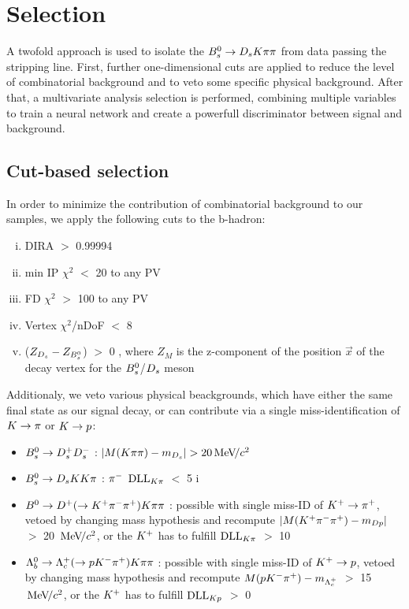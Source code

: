 \section{Selection}

A twofold approach is used to isolate the ${{B}^0_{s}}\rightarrow{\ensuremath{{D}_{s}}}{\ensuremath{K}}{\ensuremath{\pi}}{\ensuremath{\pi}}$ from data passing the stripping line. 
First, further one-dimensional cuts are applied to reduce the level of combinatorial background and to veto some specific physical background. 
After that, a multivariate analysis selection is performed, combining multiple variables to train a neural network and create a powerfull discriminator between signal and background. 

\subsection{Cut-based selection}

In order to minimize the contribution of combinatorial background to our samples, we apply the following cuts to the b-hadron:

\begin{enumerate}[(i)]

\item DIRA $>$ 0.99994

\item min IP $\chi^{2}$ $<$ 20 to any PV

\item FD $\chi^{2}$ $>$ 100 to any PV

\item Vertex $\chi^{2}$/nDoF $<$ 8 

\item ($Z_{{{D}_{s}}}-Z_{{{B}^0_{s}}}$) $>$ 0 , where $Z_{M}$ is the z-component of the position $\vec{x}$ of the decay vertex for the ${{B}^0_{s}}$/${{D}_{s}}$ meson

\end{enumerate}    


Additionaly, we veto various physical beackgrounds, which have either the same final state as our signal decay, or can contribute via a single miss-identification of ${K}\rightarrow{\ensuremath{\pi}}$ or ${K}\rightarrow{\ensuremath{p}}$:

\begin{itemize}

\item ${{B}^0_{s}}\rightarrow{\ensuremath{{D}^+_{s}}}{\ensuremath{{D}^-_{s}}}$ : $|M({K}{\pi}{\pi}) - m_{{{D}_{s}}}| > 20 {\mathrm{\,Me\kern -0.1em V\!/}c^2}$ 

\item ${{B}^0_{s}}\rightarrow{\ensuremath{{D}_{s}}}{\ensuremath{K}}{\ensuremath{K}}{\ensuremath{\pi}}$ : ${{\pi}^-}$ $\mathrm{DLL}_{{K}{\pi}}$ $<$ 5 
i
\item ${{B}^0}\rightarrow{\ensuremath{{D}^+}}(\rightarrow{\ensuremath{{K}^+}}{\ensuremath{{\pi}^-}}{\ensuremath{{\pi}^+}}){K}{\pi}{\pi}$ : possible with single miss-ID of ${{K}^+}\rightarrow{\ensuremath{{\pi}^+}}$, vetoed by changing mass hypothesis and recompute $|M({{K}^+}{{\pi}^-}{{\pi}^+}) - m_{Dp}|$ $>$ 20 ${\mathrm{\,Me\kern -0.1em V\!/}c^2}$, 
or the ${{K}^+}$ has to fulfill $\mathrm{DLL}_{{K}{\pi}}$ $>$ 10

\item ${{\Lambda}^0_{b}}\rightarrow{\ensuremath{{\Lambda}^+_{c}}}(\rightarrow{\ensuremath{p}}{\ensuremath{{K}^-}}{\ensuremath{{\pi}^+}}){K}{\pi}{\pi}$ : possible with single miss-ID of ${{K}^+}\rightarrow{\ensuremath{p}}$, vetoed by changing mass hypothesis and recompute $M({p}{{K}^-}{{\pi}^+}) - m_{{{\Lambda}^+_{c}}}$ $>$ 15 ${\mathrm{\,Me\kern -0.1em V\!/}c^2}$, 
or the ${{K}^+}$ has to fulfill $\mathrm{DLL}_{{K}{p}}$ $>$ 0  

\end{itemize} 


